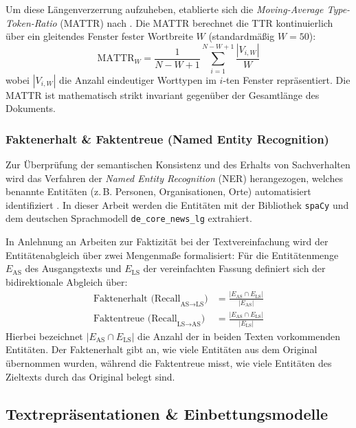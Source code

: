 Um diese Längenverzerrung aufzuheben, etablierte sich die \textit{Moving-Average Type-Token-Ratio} (MATTR) nach \citet{covington2010cutting}. Die MATTR berechnet die TTR kontinuierlich über ein gleitendes Fenster fester Wortbreite $W$ (standardmäßig $W = 50$):
\begin{equation}
    \text{MATTR}_W = \frac{1}{N - W + 1} \sum_{i=1}^{N - W + 1} \frac{|V_{i, W}|}{W}
\end{equation}
wobei $|V_{i, W}|$ die Anzahl eindeutiger Worttypen im $i$-ten Fenster repräsentiert. Die MATTR ist mathematisch strikt invariant gegenüber der Gesamtlänge des Dokuments.

\subsubsection{Faktenerhalt \& Faktentreue (Named Entity Recognition)}
Zur Überprüfung der semantischen Konsistenz und des Erhalts von Sachverhalten wird das Verfahren der \textit{Named Entity Recognition} (NER) herangezogen, welches benannte Entitäten (z.\,B. Personen, Organisationen, Orte) automatisiert identifiziert \citep{nadeau2007survey}. In dieser Arbeit werden die Entitäten mit der Bibliothek \texttt{spaCy} \citep{honnibal2020spacy} und dem deutschen Sprachmodell \texttt{de\_core\_news\_lg} extrahiert.

In Anlehnung an Arbeiten zur Faktizität bei der Textvereinfachung \citep{devaraj2021evaluating} wird der Entitätenabgleich über zwei Mengenmaße formalisiert: Für die Entitätenmenge $E_{\text{AS}}$ des Ausgangstexts und $E_{\text{LS}}$ der vereinfachten Fassung definiert sich der bidirektionale Abgleich über:
\begin{align}
    \text{Faktenerhalt (Recall}_{\text{AS} \to \text{LS}}\text{)} &= \frac{|E_{\text{AS}} \cap E_{\text{LS}}|}{|E_{\text{AS}}|} \\
    \text{Faktentreue (Recall}_{\text{LS} \to \text{AS}}\text{)} &= \frac{|E_{\text{AS}} \cap E_{\text{LS}}|}{|E_{\text{LS}}|}
\end{align}
Hierbei bezeichnet $|E_{\text{AS}} \cap E_{\text{LS}}|$ die Anzahl der in beiden Texten vorkommenden Entitäten. Der Faktenerhalt gibt an, wie viele Entitäten aus dem Original übernommen wurden, während die Faktentreue misst, wie viele Entitäten des Zieltexts durch das Original belegt sind.

\subsection{Textrepräsentationen \& Einbettungsmodelle}
\label{sec:textrepraesentationen_einbettungen}

